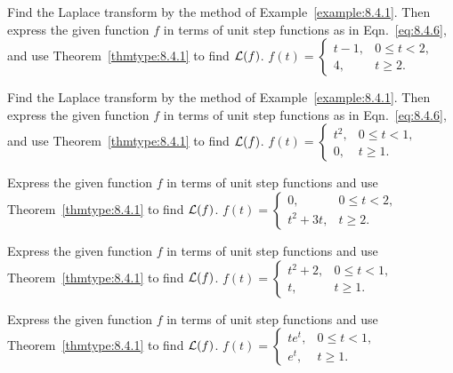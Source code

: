 \documentclass{ximera}
\begin{document}
\begin{problem}\label{exer:8.4.5}
Find the Laplace transform by
the method of Example~\ref{example:8.4.1}. Then express the given function
$f$ in terms of unit step functions as in Eqn.~\eqref{eq:8.4.6}, and use
Theorem~\ref{thmtype:8.4.1} to find ${\cal L}(f)$.
$f(t)=\left\{\begin{array}{cl} t-1,& 0\le
t<2,\\ 4,&t\ge2.\end{array}\right.$
\end{problem}

 \begin{problem}\label{exer:8.4.6}
Find the Laplace transform by
the method of Example~\ref{example:8.4.1}. Then express the given function
$f$ in terms of unit step functions as in Eqn.~\eqref{eq:8.4.6}, and use
Theorem~\ref{thmtype:8.4.1} to find ${\cal L}(f)$.
$f(t)=\left\{\begin{array}{cl} t^2,& 0\le
t<1,\\ 0,&t\ge1.\end{array}\right.$
\end{problem}

\begin{problem}\label{exer:8.4.7}
Express the
given function $f$ in terms of unit step functions
 and use Theorem~\ref{thmtype:8.4.1} to find ${\cal L}(f)$.
$f(t)=\left\{\begin{array}{cl} 0, &0\le
t<2,\\ t^2+3t,&t\ge2.\end{array}\right.$
\end{problem}

 \begin{problem}\label{exer:8.4.8}
Express the
given function $f$ in terms of unit step functions
 and use Theorem~\ref{thmtype:8.4.1} to find ${\cal L}(f)$.
 $f(t)=\left\{\begin{array}{cl} t^2+2, &0\le
t<1,\\ t,&t\ge1.\end{array}\right.$
\end{problem}


 \begin{problem}\label{exer:8.4.9}
Express the
given function $f$ in terms of unit step functions
 and use Theorem~\ref{thmtype:8.4.1} to find ${\cal L}(f)$.
 $f(t)=\left\{\begin{array}{cl} te^t,& 0\le t
<1,\\ e^t,&t\ge1.\end{array}\right.$
\end{problem}
\end{document}

